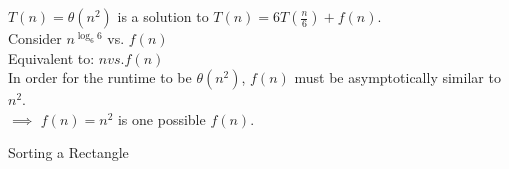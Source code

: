 \documentclass[12pt,twoside]{article}
\begin{document}
\begin{problems}
\begin{problemparts}
\bigskip $T(n) = \theta(n^{2})$ is a solution to $T(n) = 6T(\frac{n}{6}) + f(n)$. \\


\problempart Consider $n^{\log_6 6}$ vs. $f(n) $ \\
Equivalent to:  $n vs. f(n)$ \\
In order for the runtime to be $\theta(n^2)$, $f(n)$ must be asymptotically similar to $n^2$. \\
$\implies$ $f(n)=n^2$ is one possible $f(n)$.

\end{problemparts}

\problem  %

\begin{problemparts}


\problempart Sorting a Rectangle




\end{problemparts}
\end{problems}
\end{document}
